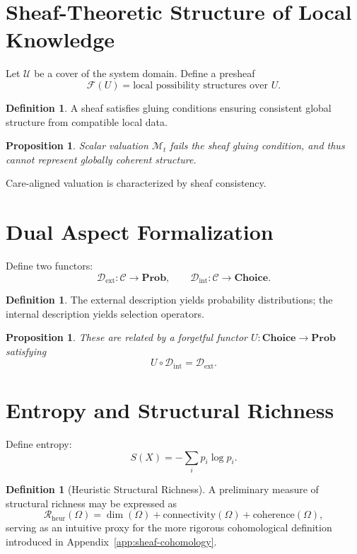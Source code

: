 \documentclass[11pt,a4paper]{article}
\newtheorem{proposition}[theorem]{Proposition}
\theoremstyle{definition}
\newtheorem{definition}[theorem]{Definition}
\theoremstyle{remark}
\begin{document}
\section{Sheaf-Theoretic Structure of Local Knowledge}

Let $\mathcal{U}$ be a cover of the system domain. Define a presheaf
\[
\mathcal{F}(U) = \text{local possibility structures over } U.
\]

\begin{definition}
A sheaf satisfies gluing conditions ensuring consistent global structure from compatible local data.
\end{definition}

\begin{proposition}
Scalar valuation $\mathcal{M}_t$ fails the sheaf gluing condition, and thus cannot represent globally coherent structure.
\end{proposition}

Care-aligned valuation is characterized by sheaf consistency.

\section{Dual Aspect Formalization}

Define two functors:
\[
\mathcal{D}_{\mathrm{ext}} : \mathcal{C} \to \mathbf{Prob}, \qquad \mathcal{D}_{\mathrm{int}} : \mathcal{C} \to \mathbf{Choice}.
\]

\begin{definition}
The external description yields probability distributions; the internal description yields selection operators.
\end{definition}

\begin{proposition}
These are related by a forgetful functor $U : \mathbf{Choice} \to \mathbf{Prob}$ satisfying
\[
U \circ \mathcal{D}_{\mathrm{int}} = \mathcal{D}_{\mathrm{ext}}.
\]
\end{proposition}

\section{Entropy and Structural Richness}

Define entropy:
\[
S(X) = -\sum_i p_i \log p_i.
\]

\begin{definition}[Heuristic Structural Richness]
A preliminary measure of structural richness may be expressed as
\[
\mathcal{R}_{\mathrm{heur}}(\Omega) = \dim(\Omega) + \mathrm{connectivity}(\Omega) + \mathrm{coherence}(\Omega),
\]
serving as an intuitive proxy for the more rigorous cohomological definition introduced in Appendix~\ref{app:sheaf-cohomology}.
\end{definition}
\end{document}
